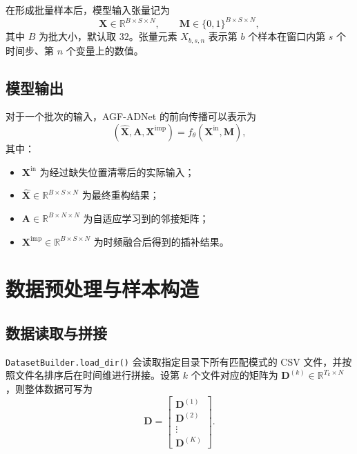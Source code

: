 在形成批量样本后，模型输入张量记为
\begin{equation}
    \mathbf{X} \in \mathbb{R}^{B \times S \times N}, \qquad
    \mathbf{M} \in \{0,1\}^{B \times S \times N},
\end{equation}
其中 $B$ 为批大小，默认取 $32$。张量元素 $X_{b,s,n}$ 表示第 $b$ 个样本在窗口内第 $s$ 个时间步、第 $n$ 个变量上的数值。

\subsection{模型输出}

对于一个批次的输入，AGF-ADNet 的前向传播可以表示为
\begin{equation}
    (\hat{\mathbf{X}}, \mathbf{A}, \mathbf{X}^{\mathrm{imp}})
    = f_{\theta}(\mathbf{X}^{\mathrm{in}}, \mathbf{M}),
\end{equation}
其中：
\begin{itemize}
    \item $\mathbf{X}^{\mathrm{in}}$ 为经过缺失位置清零后的实际输入；
    \item $\hat{\mathbf{X}} \in \mathbb{R}^{B \times S \times N}$ 为最终重构结果；
    \item $\mathbf{A} \in \mathbb{R}^{B \times N \times N}$ 为自适应学习到的邻接矩阵；
    \item $\mathbf{X}^{\mathrm{imp}} \in \mathbb{R}^{B \times S \times N}$ 为时频融合后得到的插补结果。
\end{itemize}

\section{数据预处理与样本构造}

\subsection{数据读取与拼接}

\texttt{DatasetBuilder.load\_dir()} 会读取指定目录下所有匹配模式的 CSV 文件，并按照文件名排序后在时间维进行拼接。设第 $k$ 个文件对应的矩阵为 $\mathbf{D}^{(k)} \in \mathbb{R}^{T_k \times N}$，则整体数据可写为
\begin{equation}
    \mathbf{D} =
    \begin{bmatrix}
        \mathbf{D}^{(1)} \\
        \mathbf{D}^{(2)} \\
        \vdots \\
        \mathbf{D}^{(K)}
    \end{bmatrix}.
\end{equation}

